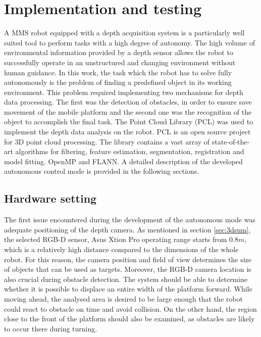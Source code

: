 \chapter{Implementation and testing}
\label{cha:implandtest}

A MMS robot equipped with a depth acquisition system is a particularly well suited tool to perform tasks with a high degree of autonomy. The high volume of environmental information provided by a depth sensor allows the robot to successfully operate in an unstructured and changing environment without human guidance. In this work, the task which the robot has to solve fully autonomously is the problem of finding a predefined object in its working environment. This problem required implementing two mechanisms for depth data processing. The first was the detection of obstacles, in order to ensure save movement of the mobile platform and the second one was the recognition of the object to accomplish the final task. The Point Cloud Library (PCL) \cite{Rusu_ICRA2011_PCL} was used to implement the depth data analysis on the robot. PCL is an open source project for 3D point cloud processing. The library contains a vast array of state-of-the-art algorithms for filtering, feature estimation, segmentation, registration and model fitting. OpenMP and FLANN. A detailed description of the developed autonomous control mode is provided in the following sections.


\section{Hardware setting}
\label{sec:setting}

The first issue encountered during the development of the autonomous mode was adequate positioning of the depth camera. As mentioned in section \ref{sec:3dsum}, the selected RGB-D sensor, Asus Xtion Pro operating range starts from $0.8m$, which is a relatively high distance compared to the dimensions of the whole robot. For this reason, the camera position and field of view determines the size of objects that can be used as targets. 	Moreover, the RGB-D camera location is also crucial during obstacle detection. The system should be able to determine whether it is possible to displace an entire width of the platform forward. While moving ahead, the analysed area is desired to be large enough that the robot could react to obstacle on time and avoid collision. On the other hand, the region close to the front of the platform should also be examined, as obstacles are likely to occur there during turning.

